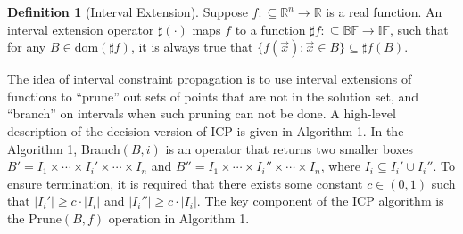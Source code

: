 \documentclass[10pt]{article}
\theoremstyle{definition}
\newtheorem{definition}{Definition}[section]
\newcommand{\dom}{\mathrm{dom}}
\begin{document}
\begin{definition}[Interval Extension]
Suppose $f:\subseteq\mathbb{R}^n\rightarrow \mathbb{R}$ is a real function. An interval extension operator $\sharp(\cdot)$ maps $f$ to a function $\sharp f:\subseteq \mathbb{BF}\rightarrow \mathbb{IF}$, such that
for any $B\in \dom(\sharp f)$, it is always true that $\{f(\vec x):\vec x\in B\}\subseteq \sharp f(B).$
\end{definition}
The idea of interval constraint propagation is to use interval extensions of functions to ``prune'' out sets of points that are not in the solution set, and ``branch'' on intervals when such pruning can not be done. A high-level description of the decision version of ICP is given in Algorithm 1. In the Algorithm 1, Branch$(B,i)$ is an operator that returns two smaller boxes $B' = I_1\times\cdots\times I_i'\times\cdots\times I_n$ and $B''=I_1\times \cdots\times I_i''\times \cdots\times I_n$, where $I_i\subseteq I_i'\cup I_i''$. To ensure termination, it is required that there exists some constant $c\in (0,1)$ such that $|I_i'|\geq c\cdot|I_i|$ and $|I_i''|\geq c\cdot |I_i|$. The key component of the ICP algorithm is the $\mathrm{Prune}(B, f)$ operation in Algorithm 1. 
\end{document}
